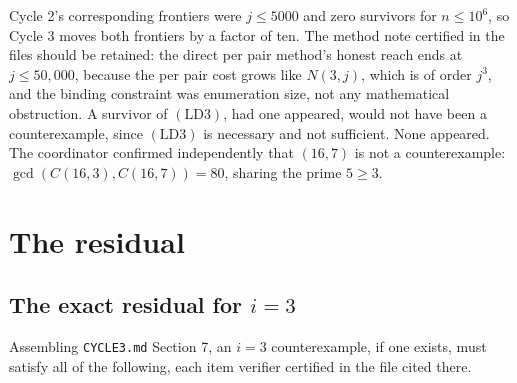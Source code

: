 \documentclass[11pt]{article}
\theoremstyle{remark}
\newcommand{\LDthree}{\ensuremath{\mathrm{(LD3)}}}
\begin{document}
Cycle 2's corresponding frontiers were $j\le 5000$ and zero survivors for $n\le 10^6$, so Cycle 3 moves both frontiers by a factor of ten. The method note certified in the files should be retained: the direct per pair method's honest reach ends at $j\le 50{,}000$, because the per pair cost grows like $N(3,j)$, which is of order $j^3$, and the binding constraint was enumeration size, not any mathematical obstruction. A survivor of \LDthree{}, had one appeared, would not have been a counterexample, since \LDthree{} is necessary and not sufficient. None appeared. The coordinator confirmed independently that $(16,7)$ is not a counterexample: $\gcd(C(16,3),C(16,7))=80$, sharing the prime $5\ge 3$.

\section{The residual}

\subsection{The exact residual for $i=3$}

Assembling \texttt{CYCLE3.md} Section 7, an $i=3$ counterexample, if one exists, must satisfy all of the following, each item verifier certified in the file cited there.
\end{document}
